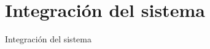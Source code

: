 \section{Integraci\'on del sistema}
\label{Integracion_sistema}

Integraci\'on del sistema
\par








